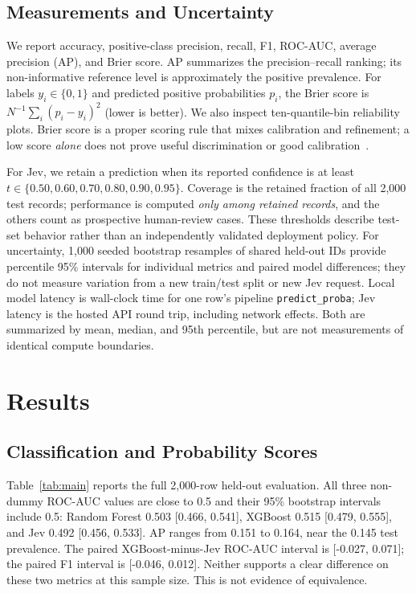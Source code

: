\documentclass{llncs}
\begin{document}
\subsection{Measurements and Uncertainty}

We report accuracy, positive-class precision, recall, F1, ROC-AUC, average precision (AP), and Brier score. AP summarizes the precision--recall ranking; its non-informative reference level is approximately the positive prevalence. For labels $y_i\in\{0,1\}$ and predicted positive probabilities $p_i$, the Brier score is $N^{-1}\sum_i(p_i-y_i)^2$ (lower is better). We also inspect ten-quantile-bin reliability plots. Brier score is a proper scoring rule that mixes calibration and refinement; a low score \emph{alone} does not prove useful discrimination or good calibration~\cite{chidambaram2025reassessing}.

For Jev, we retain a prediction when its reported confidence is at least $t\in\{0.50,0.60,0.70,0.80,0.90,0.95\}$. Coverage is the retained fraction of all 2,000 test records; performance is computed \emph{only among retained records}, and the others count as prospective human-review cases. These thresholds describe test-set behavior rather than an independently validated deployment policy. For uncertainty, 1,000 seeded bootstrap resamples of shared held-out IDs provide percentile 95\% intervals for individual metrics and paired model differences; they do not measure variation from a new train/test split or new Jev request. Local model latency is wall-clock time for one row's pipeline \texttt{predict\_proba}; Jev latency is the hosted API round trip, including network effects. Both are summarized by mean, median, and 95th percentile, but are not measurements of identical compute boundaries.

\section{Results}

\subsection{Classification and Probability Scores}

Table~\ref{tab:main} reports the full 2,000-row held-out evaluation. All three non-dummy ROC-AUC values are close to 0.5 and their 95\% bootstrap intervals include 0.5: Random Forest 0.503 [0.466, 0.541], XGBoost 0.515 [0.479, 0.555], and Jev 0.492 [0.456, 0.533]. AP ranges from 0.151 to 0.164, near the 0.145 test prevalence. The paired XGBoost-minus-Jev ROC-AUC interval is [-0.027, 0.071]; the paired F1 interval is [-0.046, 0.012]. Neither supports a clear difference on these two metrics at this sample size. This is not evidence of equivalence.
\end{document}
